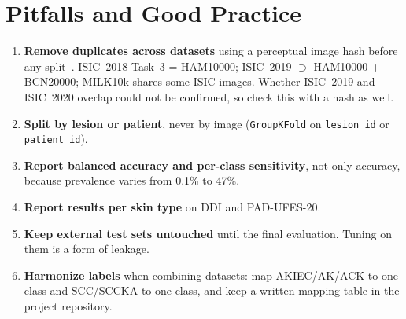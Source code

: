 \documentclass[10pt,a4paper]{article}
\begin{document}
\section{Pitfalls and Good Practice}
\begin{enumerate}
  \item \textbf{Remove duplicates across datasets} using a perceptual
        image hash before any split~\cite{cassidy2022isic}. ISIC~2018
        Task~3 = HAM10000; ISIC~2019 $\supset$ HAM10000 + BCN20000;
        MILK10k shares some ISIC images. Whether ISIC~2019 and ISIC~2020
        overlap could not be confirmed, so check this with a hash as well.
  \item \textbf{Split by lesion or patient}, never by image
        (\texttt{GroupKFold} on \texttt{lesion\_id} or
        \texttt{patient\_id}).
  \item \textbf{Report balanced accuracy and per-class sensitivity},
        not only accuracy, because prevalence varies from 0.1\% to 47\%.
  \item \textbf{Report results per skin type} on DDI and PAD-UFES-20.
  \item \textbf{Keep external test sets untouched} until the final
        evaluation. Tuning on them is a form of leakage.
  \item \textbf{Harmonize labels} when combining datasets: map
        AKIEC/AK/ACK to one class and SCC/SCCKA to one class, and keep a
        written mapping table in the project repository.
\end{enumerate}




\end{document}
